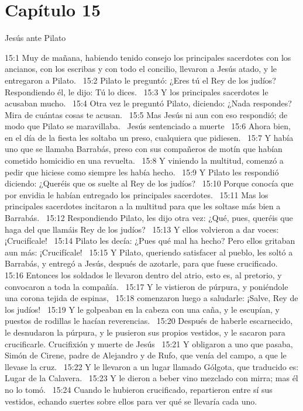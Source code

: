 \section*{Capítulo 15 }
Jesús ante Pilato   

15:1 Muy de mañana, habiendo tenido consejo los principales sacerdotes con los ancianos, con los escribas y con todo el concilio, llevaron a Jesús atado, y le entregaron a Pilato.  
15:2 Pilato le preguntó: ¿Eres tú el Rey de los judíos? Respondiendo él, le dijo: Tú lo dices.  
15:3 Y los principales sacerdotes le acusaban mucho.  
15:4 Otra vez le preguntó Pilato, diciendo: ¿Nada respondes? Mira de cuántas cosas te acusan.  
15:5 Mas Jesús ni aun con eso respondió; de modo que Pilato se maravillaba.  
Jesús sentenciado a muerte   
15:6 Ahora bien, en el día de la fiesta les soltaba un preso, cualquiera que pidiesen.  
15:7 Y había uno que se llamaba Barrabás, preso con sus compañeros de motín que habían cometido homicidio en una revuelta.  
15:8 Y viniendo la multitud, comenzó a pedir que hiciese como siempre les había hecho.  
15:9 Y Pilato les respondió diciendo: ¿Queréis que os suelte al Rey de los judíos?  
15:10 Porque conocía que por envidia le habían entregado los principales sacerdotes.  
15:11 Mas los principales sacerdotes incitaron a la multitud para que les soltase más bien a Barrabás.  
15:12 Respondiendo Pilato, les dijo otra vez: ¿Qué, pues, queréis que haga del que llamáis Rey de los judíos?  
15:13 Y ellos volvieron a dar voces: ¡Crucifícale!  
15:14 Pilato les decía: ¿Pues qué mal ha hecho? Pero ellos gritaban aun más: ¡Crucifícale!  
15:15 Y Pilato, queriendo satisfacer al pueblo, les soltó a Barrabás, y entregó a Jesús, después de azotarle, para que fuese crucificado.  
15:16 Entonces los soldados le llevaron dentro del atrio, esto es, al pretorio, y convocaron a toda la compañía.  
15:17 Y le vistieron de púrpura, y poniéndole una corona tejida de espinas,  
15:18 comenzaron luego a saludarle: ¡Salve, Rey de los judíos!  
15:19 Y le golpeaban en la cabeza con una caña, y le escupían, y puestos de rodillas le hacían reverencias.  
15:20 Después de haberle escarnecido, le desnudaron la púrpura, y le pusieron sus propios vestidos, y le sacaron para crucificarle. 
Crucifixión y muerte de Jesús   
15:21 Y obligaron a uno que pasaba, Simón de Cirene, padre de Alejandro y de Rufo, que venía del campo, a que le llevase la cruz.  
15:22 Y le llevaron a un lugar llamado Gólgota, que traducido es: Lugar de la Calavera.  
15:23 Y le dieron a beber vino mezclado con mirra; mas él no lo tomó.  
15:24 Cuando le hubieron crucificado, repartieron entre sí sus vestidos, echando suertes sobre ellos para ver qué se llevaría cada uno.  

